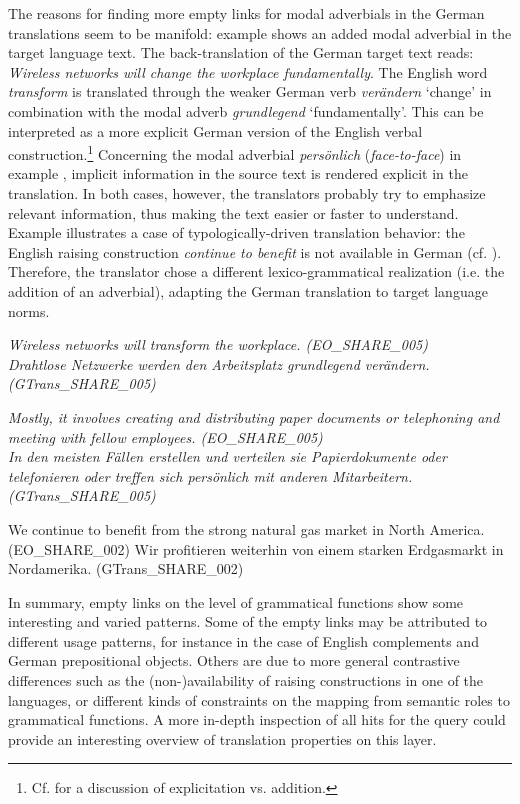 \documentclass[output=paper]{LSP/langsci}
\begin{document}
The reasons for finding more empty links for modal adverbials in the German translations seem to be manifold: example  shows an added modal adverbial in the target language text. The back-translation of the German target text reads: \textit{Wireless networks will change the workplace fundamentally}. The English word \textit{transform} is translated through the weaker German verb \textit{verändern} `change' in combination with the modal adverb \textit{grundlegend} `fundamentally'. This can be interpreted as a more explicit German version of the English verbal construction.\footnote{Cf. \citet{Hansen-SchirraEtAl2007} for a discussion of explicitation vs. addition.} Concerning the modal adverbial \textit{persönlich} (\textit{face-to-face}) in example , implicit information in the source text is rendered explicit in the translation. In both cases, however, the translators probably try to emphasize relevant information, thus making the text easier or faster to understand. Example  illustrates a case of typologically-driven translation behavior: the English raising construction \textit{continue to benefit} is not available in German (cf. \citealt[75ff]{Hawkins1986}). Therefore, the translator chose a different lexico-grammatical realization (i.e. the addition of an adverbial), adapting the German translation to target language norms.


\ea \label{ex:culo:9}
   \ea  \textit{Wireless networks will transform the workplace. \textup{(EO\_SHARE\_005)}}\\
   \ex \textit{Drahtlose Netzwerke werden den Arbeitsplatz grundlegend verändern. \textup{(GTrans\_SHARE\_005)}}
    \z
\z 


\ea \label{ex:culo:10} 
   \ea \textit{Mostly, it involves creating and distributing paper documents or telephoning and meeting with fellow employees. \textup{(EO\_SHARE\_005)}}\\
  \ex \textit{In den meisten Fällen erstellen und verteilen sie Papierdokumente oder telefonieren   oder treffen sich persönlich mit anderen Mitarbeitern. \textup{(GTrans\_SHARE\_005)}}
  \z
\z


\ea \label{ex:culo:11}
   \ea
 We continue to benefit from the strong natural gas market in North America. \textup{(EO\_SHARE\_002)}
   \ex 
   Wir profitieren weiterhin von einem starken Erdgasmarkt in Nordamerika. \textup{(GTrans\_SHARE\_002)}
   \z
\z


In summary, empty links on the level of grammatical functions show some interesting and varied patterns. Some of the empty links may be attributed to different usage patterns, for instance in the case of English complements and German prepositional objects. Others are due to more general contrastive differences such as the (non-)availability of raising constructions in one of the languages, or different kinds of constraints on the mapping from semantic roles to grammatical functions. A more in-depth inspection of all hits for the query could provide an interesting overview of translation properties on this layer.
\end{document}
